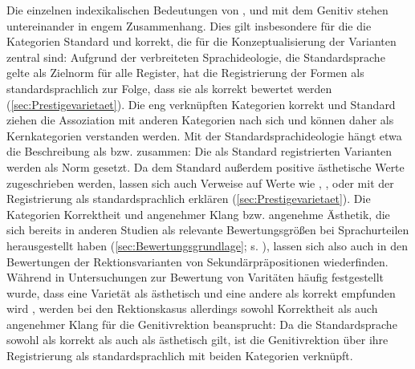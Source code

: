 Die einzelnen indexikalischen Bedeutungen von \wegen, \waehrend{} und \dank{} mit dem Genitiv stehen untereinander in engem Zusammenhang.
Dies gilt insbesondere für die die Kategorien \glqq Standard\grqq{} und \glqq korrekt\grqq, die für die Konzeptualisierung der Varianten zentral sind:
Aufgrund der verbreiteten Sprachideologie, die Standardsprache gelte als Zielnorm für alle Register, hat die Registrierung der Formen als standardsprachlich zur Folge, dass sie als korrekt bewertet werden (\autoref{sec:Prestigevarietaet}). 
Die eng verknüpften Kategorien \glqq korrekt\grqq{} und \glqq Standard\grqq{} ziehen die Assoziation mit anderen Kategorien nach sich und können daher als Kernkategorien verstanden werden.  
Mit der Standardsprachideologie hängt etwa die Beschreibung als  bzw.  zusammen:
Die als Standard registrierten Varianten werden als Norm gesetzt. 
Da dem Standard außerdem positive ästhetische Werte zugeschrieben werden, lassen sich auch Verweise auf Werte wie , ,  oder  mit der Registrierung als standardsprachlich erklären (\autoref{sec:Prestigevarietaet}). 
Die Kategorien Korrektheit und angenehmer Klang bzw. angenehme Ästhetik, die sich bereits in anderen Studien als relevante Bewertungsgrößen bei Sprachurteilen herausgestellt haben (\autoref{sec:Bewertungsgrundlage}; s. \citealp{Preston2004}), lassen sich also auch in den Bewertungen der Rektionsvarianten von Sekundärpräpositionen wiederfinden.
Während in Untersuchungen zur Bewertung von Varitäten häufig festgestellt wurde, dass eine Varietät als ästhetisch und eine andere als korrekt empfunden wird \citep[s. etwa][53]{Preston2004}, werden bei den Rektionskasus allerdings sowohl Korrektheit als auch angenehmer Klang für die Genitivrektion beansprucht: 
Da die Standardsprache sowohl als korrekt als auch als ästhetisch gilt, ist die Genitivrektion über ihre Registrierung als standardsprachlich mit beiden Kategorien verknüpft. 

